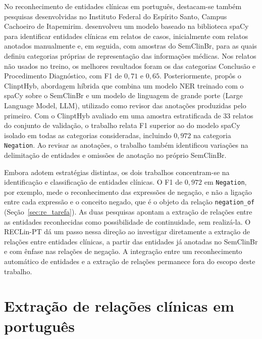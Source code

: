 No reconhecimento de entidades clínicas em português, destacam-se também pesquisas
desenvolvidas no Instituto Federal do Espírito Santo, Campus Cachoeiro de Itapemirim.
 desenvolveu um modelo baseado na biblioteca spaCy para
identificar entidades clínicas em relatos de casos, inicialmente com relatos anotados
manualmente e, em seguida, com amostras do SemClinBr, para as quais definiu categorias
próprias de representação das informações médicas. Nos relatos não usados no treino,
os melhores resultados foram os das categorias Conclusão e Procedimento Diagnóstico,
com F1 de $0{,}71$ e $0{,}65$. Posteriormente, 
propôs o ClinptHyb, abordagem híbrida que combina um modelo NER treinado com o spaCy
sobre o SemClinBr e um modelo de linguagem de grande porte
(\foreignlanguage{english}{Large Language Model}, LLM), utilizado como revisor das
anotações produzidas pelo primeiro. Com o ClinptHyb avaliado em uma amostra
estratificada de 33 relatos do conjunto de validação, o trabalho relata F1 superior ao
do modelo spaCy isolado em todas as categorias consideradas, incluindo $0{,}972$ na
categoria \texttt{Negation}. Ao
revisar as anotações, o trabalho também identificou variações na delimitação de
entidades e omissões de anotação no próprio SemClinBr.

Embora adotem estratégias distintas, os dois trabalhos concentram-se na
identificação e classificação de entidades clínicas. O F1 de $0{,}972$ em
\texttt{Negation}, por exemplo, mede o reconhecimento das expressões de negação, e não
a ligação entre cada expressão e o conceito negado, que é o objeto da relação
\texttt{negation\_of} (Seção~\ref{sec:re_tarefa}). As duas pesquisas apontam a
extração de relações entre as entidades reconhecidas como possibilidade de
continuidade, sem realizá-la. O RECLin-PT dá um passo nessa direção ao investigar
diretamente a extração de relações entre entidades clínicas, a partir das entidades
já anotadas no SemClinBr e com ênfase nas relações de negação. A integração entre um
reconhecimento automático de entidades e a extração de relações permanece fora do
escopo deste trabalho.

\section{Extração de relações clínicas em português}

